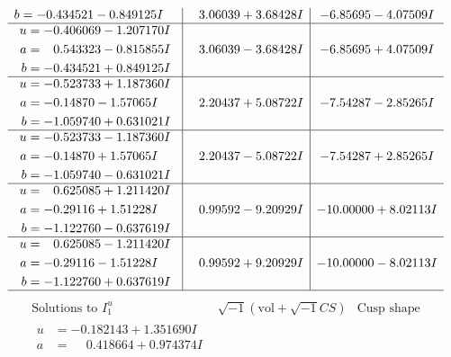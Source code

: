 \documentclass[1p]{elsarticle_modified}
\theoremstyle{definition}
\newcommand{\I}{\sqrt{-1}}
\begin{document}
$$\begin{array}{c|c|c}
\begin{aligned}
b &= -0.434521 - 0.849125 I\end{aligned}
 & \phantom{-}3.06039 + 3.68428 I & -6.85695 - 4.07509 I \\ \hline\begin{aligned}
u &= -0.406069 - 1.207170 I \\
a &= \phantom{-}0.543323 - 0.815855 I \\
b &= -0.434521 + 0.849125 I\end{aligned}
 & \phantom{-}3.06039 - 3.68428 I & -6.85695 + 4.07509 I \\ \hline\begin{aligned}
u &= -0.523733 + 1.187360 I \\
a &= -0.14870 - 1.57065 I \\
b &= -1.059740 + 0.631021 I\end{aligned}
 & \phantom{-}2.20437 + 5.08722 I & -7.54287 - 2.85265 I \\ \hline\begin{aligned}
u &= -0.523733 - 1.187360 I \\
a &= -0.14870 + 1.57065 I \\
b &= -1.059740 - 0.631021 I\end{aligned}
 & \phantom{-}2.20437 - 5.08722 I & -7.54287 + 2.85265 I \\ \hline\begin{aligned}
u &= \phantom{-}0.625085 + 1.211420 I \\
a &= -0.29116 + 1.51228 I \\
b &= -1.122760 - 0.637619 I\end{aligned}
 & \phantom{-}0.99592 - 9.20929 I & -10.00000 + 8.02113 I \\ \hline\begin{aligned}
u &= \phantom{-}0.625085 - 1.211420 I \\
a &= -0.29116 - 1.51228 I \\
b &= -1.122760 + 0.637619 I\end{aligned}
 & \phantom{-}0.99592 + 9.20929 I & -10.00000 - 8.02113 I\\
 \hline 
 \end{array}$$\newpage$$\begin{array}{c|c|c}  
\text{Solutions to }I^u_{1}& \I (\text{vol} + \sqrt{-1}CS) & \text{Cusp shape}\\
 \hline 
\begin{aligned}
u &= -0.182143 + 1.351690 I \\
a &= \phantom{-}0.418664 + 0.974374 I \\

\end{aligned}
\end{array}$$
\end{document}
